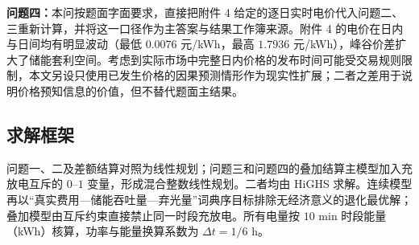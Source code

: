 \indent\textbf{问题四：}本问按题面字面要求，直接把附件 4 给定的逐日实时电价代入问题二、三重新计算，并将这一口径作为主答案与结果工作簿来源。附件 4 的电价在日内与日间均有明显波动（最低 $0.0076$ 元/kWh，最高 $1.7936$ 元/kWh），峰谷价差扩大了储能套利空间。考虑到实际市场中完整日内价格的发布时间可能受交易规则限制，本文另设只使用已发生价格的因果预测情形作为现实性扩展；二者之差用于说明价格预知信息的价值，但不替代题面主结果。

\subsection{求解框架}

问题一、二及差额结算对照为线性规划；问题三和问题四的叠加结算主模型加入充放电互斥的 $0$--$1$ 变量，形成混合整数线性规划。二者均由 HiGHS 求解。连续模型再以“真实费用—储能吞吐量—弃光量”词典序目标排除无经济意义的退化最优解；叠加模型由互斥约束直接禁止同一时段充放电。所有电量按 $10$ min 时段能量（kWh）核算，功率与能量换算系数为 $\Delta t=1/6$ h。
